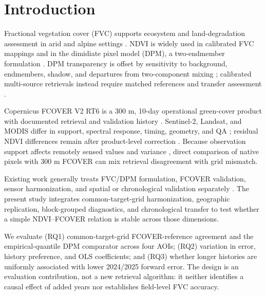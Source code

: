 \section{Introduction}
Fractional vegetation cover (FVC) supports ecosystem and land-degradation assessment in arid and alpine settings \citep{chen2016uav,li2019plateau,han2023}. NDVI \citep{tucker1979} is widely used in calibrated FVC mappings and in the dimidiate pixel model (DPM), a two-endmember formulation \citep{carlson1997,gutman1998,jiapaer2011,yan2022dpm}. DPM transparency is offset by sensitivity to background, endmembers, shadow, and departures from two-component mixing \citep{huete1988,montandon2008,mu2024}; calibrated multi-source retrievals instead require matched references and transfer assessment \citep{wang2018fvc,mu2021multisource,song2022fvc}.

Copernicus FCOVER V2 RT6 is a 300 m, 10-day operational green-cover product with documented retrieval and validation history \citep{baret2013,camacho2013,liu2019,fuster2020,copernicus2025validation,copernicus2026atbd,copernicus2026pum}. Sentinel-2, Landsat, and MODIS differ in support, spectral response, timing, geometry, and QA \citep{drusch2012,roy2014,vermote2016}; residual NDVI differences remain after product-level correction \citep{claverie2018,zhang2018ndvi,shang2019,trevisiol2024}. Because observation support affects remotely sensed values and variance \citep{woodcock1987,atkinson2000}, direct comparison of native pixels with 300 m FCOVER can mix retrieval disagreement with grid mismatch.

Existing work generally treats FVC/DPM formulation, FCOVER validation, sensor harmonization, and spatial or chronological validation separately \citep{roberts2017,meyer2018,ploton2020,tashman2000,bergmeir2012}. The present study integrates common-target-grid harmonization, geographic replication, block-grouped diagnostics, and chronological transfer to test whether a simple NDVI--FCOVER relation is stable across those dimensions.

We evaluate (RQ1) common-target-grid FCOVER-reference agreement and the empirical-quantile DPM comparator across four AOIs; (RQ2) variation in error, history preference, and OLS coefficients; and (RQ3) whether longer histories are uniformly associated with lower 2024/2025 forward error. The design is an evaluation contribution, not a new retrieval algorithm: it neither identifies a causal effect of added years nor establishes field-level FVC accuracy.

